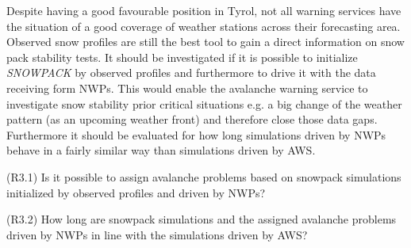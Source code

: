 Despite having a good favourable position in Tyrol, not all warning services have the situation of a good 
coverage of weather stations across their forecasting area. Observed snow profiles are still the best tool to 
gain a direct information on snow pack stability tests. It should be investigated if it is possible to 
initialize \textit{SNOWPACK} by observed profiles and furthermore to drive it with the data receiving form NWPs. 
This would enable the avalanche warning service to investigate snow stability prior critical situations e.g. a
 big change of the weather pattern (as an upcoming weather front) and therefore close those data gaps. 
 Furthermore it should be evaluated for how long simulations driven by NWPs behave in a fairly similar way 
 than simulations driven by AWS. 

\begin{tcolorbox}[]
    (R3.1) Is it possible to assign avalanche problems based on snowpack simulations initialized by observed profiles and driven by NWPs?
\end{tcolorbox}

\begin{tcolorbox}[]
    (R3.2) How long are snowpack simulations and the assigned avalanche problems driven by NWPs in line with the simulations driven by AWS?
\end{tcolorbox}
